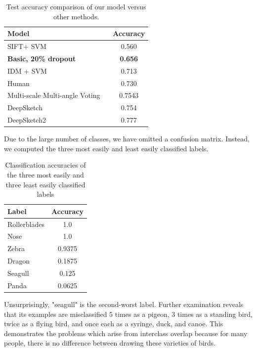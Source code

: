 \documentclass[10pt,twocolumn,letterpaper]{article}
\begin{document}
\begin{table}[h]
        \begin{center}
        \begin{tabular}{l | c}
        Model & Accuracy \\
        \hline\hline
        SIFT+ SVM  ~\cite{eitz2012hdhso}  &  0.560 \\
        \textbf{Basic, 20\% dropout}& \textbf{0.656} \\
        IDM + SVM ~\cite{yesilbek2015svm} & 0.713 \\
        Human ~\cite{eitz2012hdhso} & 0.730 \\
        Multi-scale Multi-angle Voting ~\cite{Sadouk2016} &0.7543\\
        DeepSketch ~\cite{seddati2015deepsketch}  & 0.754\\
        DeepSketch2 ~\cite{seddati2016deepsketch} & 0.777\\
        \end{tabular}
        \end{center}
        \caption{Test accuracy comparison of our model versus other methods.}
\end{table}

Due to the large number of classes, we have omitted a confusion matrix. Instead, we computed the three most easily and least easily classified labels. 

\begin{table}[h]
        \begin{center}
        \begin{tabular}{l | c}
        Label & Accuracy \\
        \hline\hline
        Rollerblades & 1.0 \\
        Nose & 1.0 \\
        Zebra & 0.9375 \\ \hline
        Dragon & 0.1875 \\
        Seagull & 0.125 \\
        Panda & 0.0625
        \end{tabular}
        \end{center}
        \caption{Classification accuracies of the three most easily and three least easily classified labels}
\end{table}

Unsurprisingly, "seagull" is the second-worst label. Further examination reveals that its examples are misclassified 5 times as a pigeon, 3 times as a standing bird, twice as a flying bird, and once each as a syringe, duck, and canoe. This demonstrates the problems which arise from interclass overlap because for many people, there is no difference between drawing these varieties of birds. 
\end{document}
